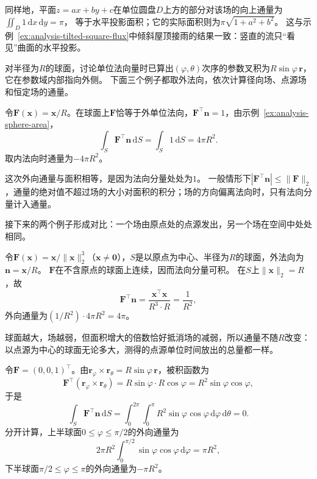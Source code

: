 同样地，平面$z=ax+by+c$在单位圆盘$D$上方的部分对该场的向上通量为$\iint_D1\,\mathrm dx\,\mathrm dy=\pi$，
等于水平投影面积；它的实际面积则为$\pi\sqrt{1+a^2+b^2}$。
这与示例~\ref{ex:analysis-tilted-square-flux}中倾斜屋顶接雨的结果一致：竖直的流只“看见”曲面的水平投影。

对半径为$R$的球面，讨论单位法向量时已算出$(\varphi,\theta)$次序的参数叉积为$R\sin\varphi\,\bm r$，它在参数域内部指向外侧。
下面三个例子都取外法向，依次计算径向场、点源场和恒定场的通量。

\begin{example}[径向场穿过球面]
\label{ex:analysis-radial-field-sphere-flux}
令$\bm F(\bm x)=\bm x/R$。在球面上$\bm F$恰等于外单位法向，$\bm F^\top\bm n=1$，由示例~\ref{ex:analysis-sphere-area}，
\[
 \int_S\bm F^\top\bm n\,\mathrm dS
 =\int_S1\,\mathrm dS=4\pi R^2.
\]
取内法向时通量为$-4\pi R^2$。
\end{example}

这次外向通量与面积相等，是因为法向分量处处为$1$。
一般情形下$|\bm F^\top\bm n|\leq\lVert\bm F\rVert_2$，通量的绝对值不超过场的大小对面积的积分；场的方向偏离法向时，只有法向分量计入通量。

接下来的两个例子形成对比：一个场由原点处的点源发出，另一个场在空间中处处相同。

\begin{example}[点源场的通量与半径无关]
\label{ex:analysis-point-source-sphere-flux}
令$\bm F(\bm x)=\bm x/\lVert\bm x\rVert_2^3$（$\bm x\neq\bm0$），$S$是以原点为中心、半径为$R$的球面，外法向为$\bm n=\bm x/R$。
$\bm F$在不含原点的球面上连续，因而法向分量可积。
在$S$上$\lVert\bm x\rVert_2=R$，故
\[
 \bm F^\top\bm n=\frac{\bm x^\top\bm x}{R^3\cdot R}=\frac1{R^2},
\]
外向通量为$(1/R^2)\cdot4\pi R^2=4\pi$。
\end{example}

球面越大，场越弱，但面积增大的倍数恰好抵消场的减弱，所以通量不随$R$改变：
以点源为中心的球面无论多大，测得的点源单位时间放出的总量都一样。

\begin{example}[恒定场穿过球面的净通量为零]
\label{ex:analysis-constant-field-sphere-flux}
令$\bm F=(0,0,1)^\top$。由$\bm r_\varphi\times\bm r_\theta=R\sin\varphi\,\bm r$，被积函数为
\[
 \bm F^\top(\bm r_\varphi\times\bm r_\theta)=R\sin\varphi\cdot R\cos\varphi=R^2\sin\varphi\cos\varphi,
\]
于是
\[
 \int_S\bm F^\top\bm n\,\mathrm dS
 =\int_0^{2\pi}\int_0^\pi R^2\sin\varphi\cos\varphi\,\mathrm d\varphi\,\mathrm d\theta=0.
\]
分开计算，上半球面$0\leq\varphi\leq\pi/2$的外向通量为
\[
 2\pi R^2\int_0^{\pi/2}\sin\varphi\cos\varphi\,\mathrm d\varphi=\pi R^2,
\]
下半球面$\pi/2\leq\varphi\leq\pi$的外向通量为$-\pi R^2$。
\end{example}

